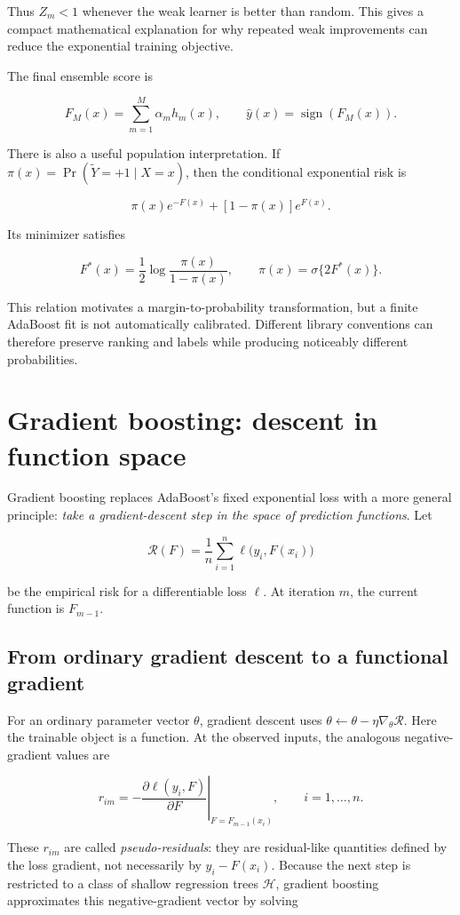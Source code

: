 \documentclass[11pt]{article}
\begin{document}
Thus $Z_m<1$ whenever the weak learner is better than random. This gives a
compact mathematical explanation for why repeated weak improvements can reduce
the exponential training objective.

The final ensemble score is

\[
 F_M(x)=\sum_{m=1}^M\alpha_m h_m(x),
 \qquad \hat y(x)=\operatorname{sign}(F_M(x)).
\]

There is also a useful population interpretation. If
$\pi(x)=\Pr(\tilde Y=+1\mid X=x)$, then the conditional exponential risk is

\[
 \pi(x)e^{-F(x)}+[1-\pi(x)]e^{F(x)}.
\]

Its minimizer satisfies

\[
 F^*(x)=\frac12\log\frac{\pi(x)}{1-\pi(x)},
 \qquad
 \pi(x)=\sigma\{2F^*(x)\}.
\]

This relation motivates a margin-to-probability transformation, but a finite
AdaBoost fit is not automatically calibrated. Different library conventions
can therefore preserve ranking and labels while producing noticeably different
probabilities.

\section{Gradient boosting: descent in function space}

Gradient boosting replaces AdaBoost's fixed exponential loss with a more
general principle: \emph{take a gradient-descent step in the space of prediction
functions}. Let

\[
 \mathcal R(F)=\frac1n\sum_{i=1}^n \ell\bigl(y_i,F(x_i)\bigr)
\]

be the empirical risk for a differentiable loss $\ell$. At iteration $m$, the
current function is $F_{m-1}$.

\subsection{From ordinary gradient descent to a functional gradient}

For an ordinary parameter vector $\theta$, gradient descent uses
$\theta\leftarrow\theta-\eta\nabla_\theta\mathcal R$. Here the trainable object
is a function. At the observed inputs, the analogous negative-gradient values
are

\[
 r_{im}
 =-\left.
 \frac{\partial\ell(y_i,F)}{\partial F}
 \right|_{F=F_{m-1}(x_i)},
 \qquad i=1,\ldots,n.
\]

These $r_{im}$ are called \emph{pseudo-residuals}: they are residual-like
quantities defined by the loss gradient, not necessarily by $y_i-F(x_i)$.
Because the next step is restricted to a class of shallow regression trees
$\mathcal H$, gradient boosting approximates this negative-gradient vector by
solving
\end{document}
